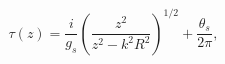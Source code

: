 \begin{equation}\label{tausug}
\tau (z) =  \frac{i}{g_s}
\left(\frac{z^2}{z^2-k^2 R^2}\right)^{1/2} 
+ \frac{\theta_{s}}{2\pi}, 
\end{equation}

